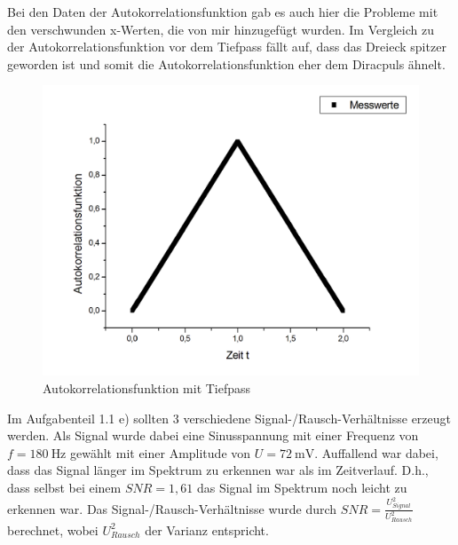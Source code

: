 \documentclass{article}						%
\begin{document}
		Bei den Daten der Autokorrelationsfunktion gab es auch hier die Probleme mit den verschwunden x-Werten, die von mir hinzugefügt wurden. Im Vergleich zu der Autokorrelationsfunktion vor dem Tiefpass fällt auf, dass das Dreieck spitzer geworden ist und somit die Autokorrelationsfunktion eher dem Diracpuls ähnelt. 
		
		\begin{figure}[h!]
			\centering
			\includegraphics[scale=0.25]{TiefpasseAutokorrelationsfunktion}
			\caption{Autokorrelationsfunktion mit Tiefpass}
		\end{figure}
		
		Im Aufgabenteil 1.1 e) sollten 3 verschiedene Signal-/Rausch-Verhältnisse erzeugt werden. Als Signal wurde dabei eine Sinusspannung mit einer Frequenz von $ f = \SI{180}{\hertz} $ gewählt mit einer Amplitude von $ U = \SI{72}{\milli\volt} $. Auffallend war dabei, dass das Signal länger im Spektrum zu erkennen war als im Zeitverlauf. D.h., dass selbst bei einem $ SNR = 1,61 $ das Signal im Spektrum noch leicht zu erkennen war. Das Signal-/Rausch-Verhältnisse wurde durch $ SNR = \frac{U^2_{Signal}}{U^2_{Rausch}}$ berechnet, wobei $ U^2_{Rausch}  $ der Varianz entspricht.
		
\end{document}
